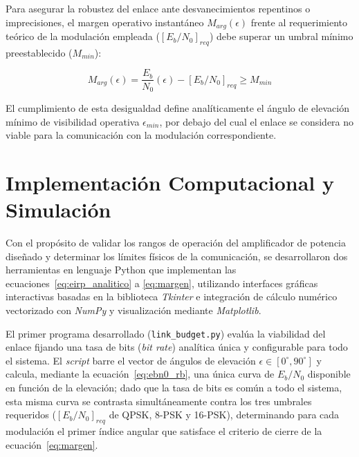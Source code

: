 Para asegurar la robustez del enlace ante desvanecimientos repentinos o imprecisiones, el margen operativo instantáneo $M_{arg}(\epsilon)$ frente al requerimiento teórico de la modulación empleada ($[E_b/N_0]_{req}$) debe superar un umbral mínimo preestablecido ($M_{min}$):

\begin{equation}
    M_{arg}(\epsilon) = \frac{E_b}{N_0}(\epsilon) - [E_b/N_0]_{req} \ge M_{min}
    \label{eq:margen}
\end{equation}

El cumplimiento de esta desigualdad define analíticamente el ángulo de elevación mínimo de visibilidad operativa $\epsilon_{min}$, por debajo del cual el enlace se considera no viable para la comunicación con la modulación correspondiente.

\section{Implementación Computacional y Simulación}
Con el propósito de validar los rangos de operación del amplificador de potencia diseñado y determinar los límites físicos de la comunicación, se desarrollaron dos herramientas en lenguaje Python que implementan las ecuaciones~\eqref{eq:eirp_analitico} a \eqref{eq:margen}, utilizando interfaces gráficas interactivas basadas en la biblioteca \textit{Tkinter} e integración de cálculo numérico vectorizado con \textit{NumPy} y visualización mediante \textit{Matplotlib}.

El primer programa desarrollado (\texttt{link\_budget.py}) evalúa la viabilidad del enlace fijando una tasa de bits (\textit{bit rate}) analítica única y configurable para todo el sistema. El \textit{script} barre el vector de ángulos de elevación $\epsilon \in [0^\circ, 90^\circ]$ y calcula, mediante la ecuación~\eqref{eq:ebn0_rb}, una única curva de $E_b/N_0$ disponible en función de la elevación; dado que la tasa de bits es común a todo el sistema, esta misma curva se contrasta simultáneamente contra los tres umbrales requeridos ($[E_b/N_0]_{req}$ de QPSK, 8-PSK y 16-PSK), determinando para cada modulación el primer índice angular que satisface el criterio de cierre de la ecuación~\eqref{eq:margen}.

